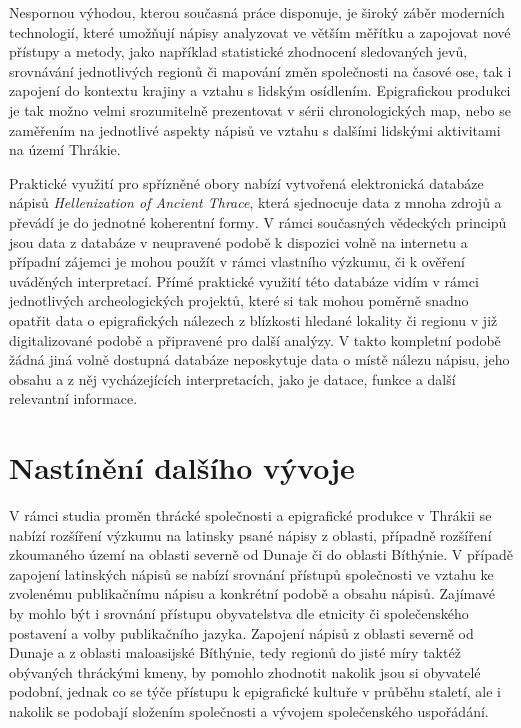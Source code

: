 Nespornou výhodou, kterou současná práce disponuje, je široký záběr moderních technologií, které umožňují nápisy analyzovat ve větším měřítku a zapojovat nové přístupy a metody, jako například statistické zhodnocení sledovaných jevů, srovnávání jednotlivých regionů či mapování změn společnosti na časové ose, tak i zapojení do kontextu krajiny a vztahu s lidským osídlením. Epigrafickou produkci je tak možno velmi srozumitelně prezentovat v sérii chronologických map, nebo se zaměřením na jednotlivé aspekty nápisů ve vztahu s dalšími lidskými aktivitami na území Thrákie.

Praktické využití pro spřízněné obory nabízí vytvořená elektronická databáze nápisů {\em Hellenization of Ancient Thrace}, která sjednocuje data z mnoha zdrojů a převádí je do jednotné koherentní formy{\em .} V rámci současných vědeckých principů jsou data z databáze v neupravené podobě k dispozici volně na internetu a případní zájemci je mohou použít v rámci vlastního výzkumu, či k ověření uváděných interpretací. Přímé praktické využití této databáze vidím v rámci jednotlivých archeologických projektů, které si tak mohou poměrně snadno opatřit data o epigrafických nálezech z blízkosti hledané lokality či regionu v již digitalizované podobě a připravené pro další analýzy. V takto kompletní podobě žádná jiná volně dostupná databáze neposkytuje data o místě nálezu nápisu, jeho obsahu a z něj vycházejících interpretacích, jako je datace, funkce a další relevantní informace.

\section[nastínění-dalšího-vývoje]{Nastínění dalšího vývoje}

V rámci studia proměn thrácké společnosti a epigrafické produkce v Thrákii se nabízí rozšíření výzkumu na latinsky psané nápisy z oblasti, případně rozšíření zkoumaného území na oblasti severně od Dunaje či do oblasti Bíthýnie. V případě zapojení latinských nápisů se nabízí srovnání přístupů společnosti ve vztahu ke zvolenému publikačnímu nápisu a konkrétní podobě a obsahu nápisů. Zajímavé by mohlo být i srovnání přístupu obyvatelstva dle etnicity či společenského postavení a volby publikačního jazyka. Zapojení nápisů z oblasti severně od Dunaje a z oblasti maloasijské Bíthýnie, tedy regionů do jisté míry taktéž obývaných thráckými kmeny, by pomohlo zhodnotit nakolik jsou si obyvatelé podobní, jednak co se týče přístupu k epigrafické kultuře v průběhu staletí, ale i nakolik se podobají složením společnosti a vývojem společenského uspořádání.

